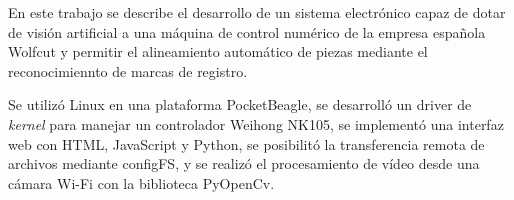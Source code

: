 En este trabajo se describe el desarrollo de un sistema electrónico capaz de dotar de visión artificial a una máquina de control numérico de la empresa española Wolfcut y permitir el alineamiento automático de piezas mediante el reconocimiennto de marcas de registro.\par
Se utilizó Linux en una plataforma PocketBeagle, se desarrolló un driver de \textit{kernel} para manejar un controlador Weihong NK105, se implementó una interfaz web con HTML, JavaScript y Python, se posibilitó la transferencia remota de archivos mediante configFS, y se realizó el procesamiento de vídeo desde una cámara Wi-Fi con la biblioteca PyOpenCv.

